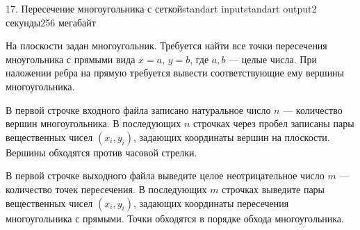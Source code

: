 \begin{problem}{17. Пересечение многоугольника с сеткой}{standart input}{standart output}{2 секунды}{256 мегабайт}

На плоскости задан многоугольник. Требуется найти все точки пересечения мноугольника с прямыми вида $x = a$, $y = b$, где $a, b$ --- целые числа. При наложении ребра на прямую требуется вывести соответствующие ему вершины многоугольника.

\InputFile

В первой строчке входного файла записано натуральное число $n$ --- количество вершин многоугольника. В последующих $n$ строчках через пробел записаны пары вещественных чисел $(x_i, y_i)$, задающих координаты вершин на плоскости. Вершины обходятся против часовой стрелки.

\OutputFile

В первой строчке выходного файла выведите целое неотрицательное число $m$ --- количество точек пересечения. В последующих $m$ строчках выведите пары вещественных чисел $(x_i, y_i)$, задающих координаты пересечения многоугольника с прямыми. Точки обходятся в порядке обхода многоугольника.

\Examples

\begin{example}%
%
%
\end{example}

\end{problem}
